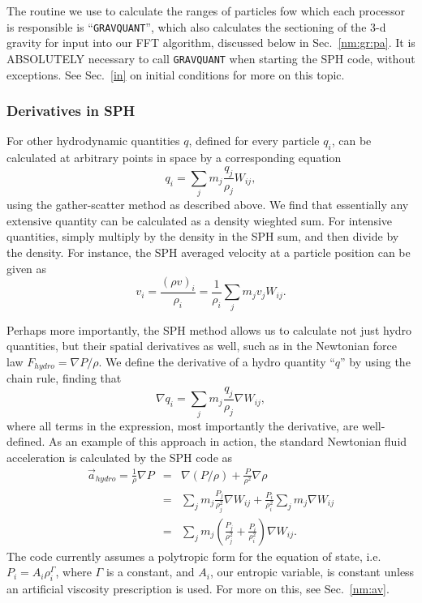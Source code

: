 The routine we use to calculate the ranges of particles fow which each processor
is responsible is ``{\tt GRAVQUANT}'', which also calculates the
sectioning of the 3-d gravity for input into our FFT algorithm,
discussed below in Sec.~\ref{nm:gr:pa}.  It is ABSOLUTELY necessary
to call {\tt GRAVQUANT} when starting the SPH code, without exceptions.  
See Sec.~\ref{in} on initial conditions for more on this topic. 
\subsubsection{Derivatives in SPH}
\label{nm:sph:de}
For other hydrodynamic quantities $q$, defined
for every particle $q_i$, can be calculated at arbitrary points in
space by a corresponding equation 
\begin{equation}
q_i=\sum_j m_j \frac{q_j}{\rho_j} W_{ij},
\end{equation}
using the gather-scatter method as described above.  We find that
essentially any extensive quantity can be calculated as a density
wieghted sum.  For intensive quantities, simply multiply by the
density in the SPH sum, and then divide by the density.  For instance,
the SPH averaged velocity at a particle position can be given as 
\begin{equation}
v_i=\frac{(\rho v)_i}{\rho_i}=\frac{1}{\rho_i}\sum_j m_j v_j W_{ij}.
\end{equation}

Perhaps more importantly, the SPH method allows us to calculate not
just hydro quantities, but their spatial derivatives as well, such as
in the Newtonian force law $F_{hydro}=\nabla P/\rho$.  We define the
derivative of a hydro quantity ``$q$'' by using the chain rule, finding
that 
\begin{equation}
\nabla q_i=\sum_j m_j
\frac{q_j}{\rho_j}\nabla W_{ij}, 
\end{equation}
where all terms in the expression, most importantly the derivative, 
are well-defined.  As an example of this approach in action, the
standard Newtonian fluid acceleration is calculated by the SPH code as
\begin{eqnarray}
\vec{a}_{hydro}=\frac{1}{\rho}\nabla P &=&
\nabla (P/\rho) + \frac{P}{\rho^2}\nabla \rho\nonumber\\
&=&\sum_j m_j\frac{P_j}{\rho_j^2}\nabla
W_{ij}+\frac{P_i}{\rho_i^2}\sum_j m_j\nabla W_{ij}\nonumber\\   
&=& \sum_j
m_j\left(\frac{P_j}{\rho_j^2}+\frac{P_i}{\rho_i^2}\right)\nabla W_{ij}.
\end{eqnarray}
The code currently assumes a polytropic form for the equation of
state, i.e. $P_i=A_i \rho_i^\Gamma$, where $\Gamma$ is a constant, and
$A_i$, our entropic variable, is constant unless an artificial
viscosity prescription is used.  For more on this, see Sec.~\ref{nm:av}.

